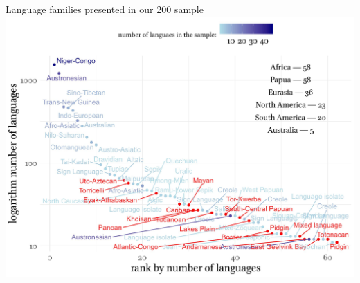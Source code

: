 \documentclass[13pt, t]{beamer}
\begin{document}
\begin{frame}{Language families presented in our 200 sample}
\includegraphics[width=\linewidth]{images/10_families_by_sample}
\end{frame}
\end{document}
